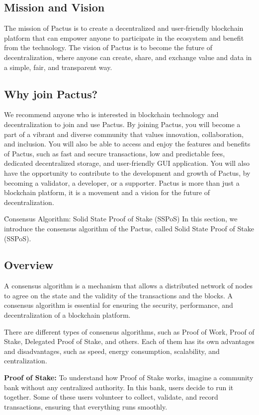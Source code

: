 \documentclass{novel}
\begin{document}
\subsection{Mission and Vision}
The mission of Pactus is to create a decentralized and user-friendly blockchain platform that can empower anyone to participate in the ecosystem and benefit from the technology. The vision of Pactus is to become the future of decentralization, where anyone can create, share, and exchange value and data in a simple, fair, and transparent way.

\subsection{Why join Pactus?}
We recommend anyone who is interested in blockchain technology and decentralization to join and use Pactus. By joining Pactus, you will become a part of a vibrant and diverse community that values innovation, collaboration, and inclusion. You will also be able to access and enjoy the features and benefits of Pactus, such as fast and secure transactions, low and predictable fees, dedicated decentralized storage, and user-friendly GUI application. You will also have the opportunity to contribute to the development and growth of Pactus, by becoming a validator, a developer, or a supporter. Pactus is more than just a blockchain platform, it is a movement and a vision for the future of decentralization.

\h{Consensus Algorithm: Solid State Proof of Stake (SSPoS)}
In this section, we introduce the consensus algorithm of the Pactus, called Solid State Proof of Stake (SSPoS).
\subsection{Overview}
A consensus algorithm is a mechanism that allows a distributed network of nodes to agree on the state and the validity of the transactions and the blocks. A consensus algorithm is essential for ensuring the security, performance, and decentralization of a blockchain platform.

There are different types of consensus algorithms, such as Proof of Work, Proof of Stake, Delegated Proof of Stake, and others. Each of them has its own advantages and disadvantages, such as speed, energy consumption, scalability, and centralization.

\textbf{Proof of Stake:} To understand how Proof of Stake works, imagine a community bank without any centralized authority. In this bank, users decide to run it together. Some of these users volunteer to collect, validate, and record transactions, ensuring that everything runs smoothly.
\end{document}
